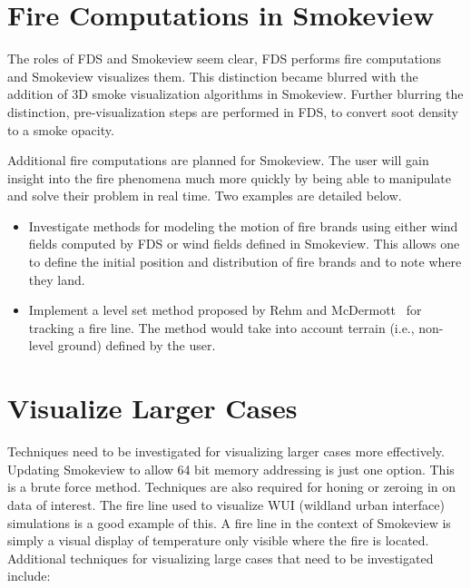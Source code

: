 \documentclass[11pt,twoside]{book}
\begin{document}
%
%

\section{Fire Computations in Smokeview}
The roles of FDS and Smokeview seem clear, FDS performs fire
computations and Smokeview visualizes them. This distinction
became blurred with the addition of 3D smoke visualization
algorithms in Smokeview. Further blurring the distinction,
pre-visualization steps are performed in FDS, to convert soot
density to a smoke opacity.

Additional fire computations are planned for Smokeview.  The user
will gain insight into the fire phenomena much more quickly by
being able to manipulate and solve their problem in real time. Two
examples are detailed below.

\begin{itemize}
\item  Investigate methods for modeling the motion of fire brands
using either wind fields computed by FDS or wind fields defined in
Smokeview. This allows one to define the initial position and
distribution of fire brands and to note where they land.

\item Implement a level set method proposed by Rehm and
McDermott~\cite{Rehm:LevelSet} for tracking a fire line.  The
method would take into account terrain (i.e., non-level
ground) defined by the user.
\end{itemize}

%
%

\section{Visualize Larger Cases}
Techniques need to be investigated for visualizing larger cases
more effectively.  Updating Smokeview to allow 64 bit memory
addressing is just one option.  This is a brute force method.
Techniques are also required for honing or zeroing in on data of
interest.  The fire line used to visualize WUI (wildland urban
interface) simulations is a good example of this.  A fire line in
the context of Smokeview is simply a visual display of temperature
only visible where the fire is located.  Additional techniques for
visualizing large cases that need to be investigated include:
\end{document}
